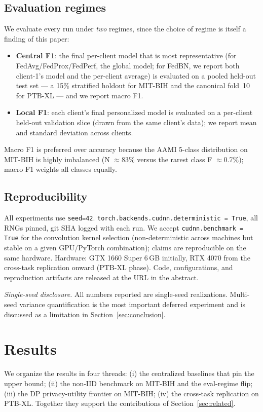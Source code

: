\documentclass[conference]{IEEEtran}
\newcommand{\code}[1]{\texttt{\small #1}}
\begin{document}
\subsection{Evaluation regimes}
We evaluate every run under \emph{two} regimes, since the choice of regime is itself a finding of this paper:
\begin{itemize}
\item \textbf{Central F1}: the final per-client model that is most representative (for FedAvg/FedProx/FedPerf, the global model; for FedBN, we report both client-1's model and the per-client average) is evaluated on a pooled held-out test set --- a 15\% stratified holdout for MIT-BIH and the canonical fold~10 for PTB-XL --- and we report macro F1.
\item \textbf{Local F1}: each client's final personalized model is evaluated on a per-client held-out validation slice (drawn from the same client's data); we report mean and standard deviation across clients.
\end{itemize}
Macro F1 is preferred over accuracy because the AAMI 5-class distribution on MIT-BIH is highly imbalanced (N $\approx$83\% versus the rarest class F $\approx$0.7\%); macro F1 weights all classes equally.

\subsection{Reproducibility}
All experiments use \code{seed=42}. \code{torch.backends.cudnn.deterministic = True}, all RNGs pinned, git SHA logged with each run. We accept \code{cudnn.benchmark = True} for the convolution kernel selection (non-deterministic across machines but stable on a given GPU/PyTorch combination); claims are reproducible on the same hardware. Hardware: GTX 1660 Super 6\,GB initially, RTX 4070 from the cross-task replication onward (PTB-XL phase). Code, configurations, and reproduction artifacts are released at the URL in the abstract.

\emph{Single-seed disclosure.} All numbers reported are single-seed realizations. Multi-seed variance quantification is the most important deferred experiment and is discussed as a limitation in Section~\ref{sec:conclusion}.

\section{Results}\label{sec:results}
We organize the results in four threads: (i) the centralized baselines that pin the upper bound; (ii) the non-IID benchmark on MIT-BIH and the eval-regime flip; (iii) the DP privacy-utility frontier on MIT-BIH; (iv) the cross-task replication on PTB-XL. Together they support the contributions of Section~\ref{sec:related}.
\end{document}

